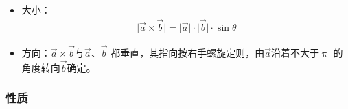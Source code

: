 \documentclass[
	11pt, %
	a4paper, %
]{WhuSakuraBook}
\begin{document}
    \begin{itemize}
        \item 大小：
            \begin{align}
                \lvert \overrightarrow{a} \times \overrightarrow{b} \rvert =
                \lvert \overrightarrow{a} \rvert \cdot \lvert \overrightarrow{b} \rvert \cdot \sin\theta
            \end{align}            
        \item 方向：\(\overrightarrow{a} \times \overrightarrow{b}\)与\(\overrightarrow{a}\)、\(\overrightarrow{b}\)
            都垂直，其指向按右手螺旋定则，由\(\overrightarrow{a}\)沿着不大于\(\uppi\)
            的角度转向\(\overrightarrow{b}\)确定。
    \end{itemize}

\subsubsection{性质}
\end{document}
